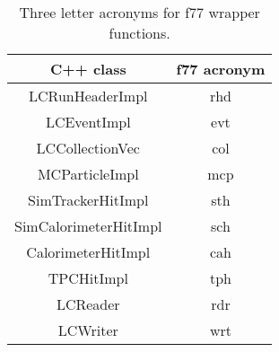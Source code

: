 \begin{table}
\begin{center}
\begin{tabular}{|c|c|}
\hline
\rule[-5mm]{0mm}{10mm} C++ class  &  f77 acronym   \\ \hline \hline

 LCRunHeaderImpl       & rhd \\ \hline
 LCEventImpl           & evt \\ \hline
 LCCollectionVec       & col \\ \hline
 MCParticleImpl        & mcp \\ \hline
 SimTrackerHitImpl     & sth \\ \hline
 SimCalorimeterHitImpl & sch \\ \hline
 CalorimeterHitImpl    & cah \\ \hline
 TPCHitImpl            & tph \\ \hline
 LCReader              & rdr \\ \hline
 LCWriter              & wrt \\ \hline

\end{tabular}
\end{center}
\caption{Three letter acronyms for f77 wrapper functions.}
\label{tab_f77}
\end{table}
